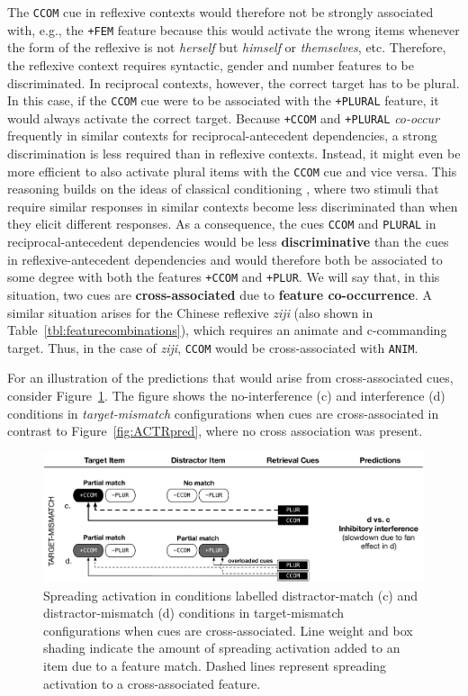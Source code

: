 \documentclass{cambridge7A}\usepackage[]{graphicx}\usepackage[]{color}
\newcommand{\actrcue}[1]{\texttt{\uppercase{#1}}}
\newcommand{\match}[1]{\texttt{+\uppercase{#1}}}
\begin{document}
The \actrcue{CCOM} cue in reflexive contexts would therefore not be strongly associated with, e.g., the \match{FEM} feature because this would activate the wrong items whenever the form of the reflexive is not \textit{herself} but \textit{himself} or \textit{themselves}, etc. Therefore, the reflexive context requires syntactic, gender and number features to be discriminated.
In reciprocal contexts, however, the correct target has to be plural. In this case, if the \actrcue{CCOM} cue were to be associated with the \match{PLURAL} feature, it would always activate the correct target. 
Because \match{CCOM} and \match{PLURAL} \emph{co-occur} frequently in similar contexts for reciprocal-antecedent dependencies, a strong discrimination is less required than in reflexive contexts. Instead, it might even be more efficient to also activate plural items with the \actrcue{ccom} cue and vice versa. 
This reasoning builds on the ideas of classical conditioning \citep{RescorlaWagner1972}, where two stimuli that require similar responses in similar contexts become less discriminated than when they elicit different responses.
As a consequence, the cues \actrcue{ccom} and \actrcue{plural} in reciprocal-antecedent dependencies would be less \textbf{discriminative} than the cues in reflexive-antecedent dependencies and would therefore both be associated to some degree with both the features \match{ccom} and \match{plur}. We will say that, in this situation, two cues are  \textbf{cross-associated} due to \textbf{feature co-occurrence}.
A similar situation arises for the Chinese reflexive \textit{ziji} (also shown in Table~\ref{tbl:featurecombinations}), which requires an animate and c-commanding target. Thus, in the case of \textit{ziji}, \actrcue{ccom} would be cross-associated with \actrcue{anim}.

For an illustration of the predictions that would arise from cross-associated cues, consider Figure~\ref{fig:newmodelcueconf}. The figure shows the no-interference (c) and interference (d) conditions in \emph{target-mismatch} configurations when cues are cross-associated in contrast to Figure~\ref{fig:ACTRpred}, where no cross association was present.

\begin{figure}[!htbp]
\includegraphics[width=\textwidth]{figures/tableNewmodelcueconf}
	\caption{Spreading activation in conditions labelled distractor-match (c) and distractor-mismatch (d) conditions in target-mismatch configurations when cues are cross-associated. Line weight and box shading indicate the amount of spreading activation added to an item due to a feature match. Dashed lines represent spreading activation to a cross-associated feature.}
	\label{fig:newmodelcueconf}
\end{figure}
\end{document}
